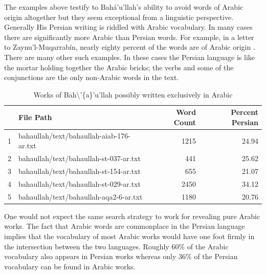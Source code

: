\documentclass[12pt, oneside]{report}
\begin{document}
\par
The examples above testify to Bah\'{a}'u'llah's ability to avoid words of Arabic origin altogether but they seem exceptional from a linguistic perspective.
Generally His Persian writing is riddled with Arabic vocabulary.
In many cases there are significantly more Arabic than Persian words.
For example, in a letter to Zaynu'l-Muqarrab\'{i}n, nearly eighty percent of the words are of Arabic origin \cite{bahaullah_muntakhabati-az_163}.
There are many other such examples.
In these cases the Persian language is like the mortar holding together the Arabic bricks; the verbs and some of the conjunctions are the only non-Arabic words in the text.
\begin{table}[]
	\centering
		\begin{tabular}{|l|l|r|r|}
			\hline
			\rowcolor[HTML]{EFEFEF}
			\textbf{} & \textbf{File Path}                       & \textbf{Word Count}          & \textbf{Percent Persian}      \\ \hline
1         & bahaullah/text/bahaullah-aiab-176-ar.txt & \cellcolor[HTML]{FFFFFF}1215 & \cellcolor[HTML]{FFFFFF}24.94 \\ \hline
			\rowcolor[HTML]{EFEFEF}
2         & bahaullah/text/bahaullah-st-037-ar.txt   & 441                          & 25.62                         \\ \hline
			\rowcolor[HTML]{FFFFFF}
3         & bahaullah/text/bahaullah-st-154-ar.txt   & 655                          & 21.07                         \\ \hline
			\rowcolor[HTML]{EFEFEF}
4         & bahaullah/text/bahaullah-st-029-ar.txt   & 2450                         & 34.12                         \\ \hline
			\rowcolor[HTML]{FFFFFF}
5         & bahaullah/text/bahaullah-aqa2-6-ar.txt   & 1180                         & 20.76                         \\ \hline
\end{tabular}
\caption{Works of Bah\textbackslash{}'\{a\}'u'llah possibly written exclusively in Arabic }
\label{tab:pure-arabic}
\end{table}
\par
One would not expect the same search strategy to work for revealing pure Arabic works.
The fact that Arabic words are commonplace in the Persian language implies that the vocabulary of most Arabic works would have one foot firmly in the intersection between the two languages.
Roughly 60\% of the Arabic vocabulary also appears in Persian works whereas only 36\% of the Persian vocabulary can be found in Arabic works.
\end{document}
